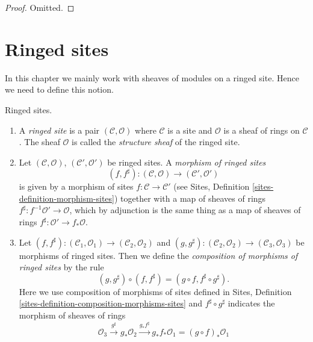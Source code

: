 \begin{proof}
Omitted.
\end{proof}








\section{Ringed sites}
\label{section-ringed-sites}

\noindent
In this chapter we mainly work with sheaves of modules on a ringed site.
Hence we need to define this notion.

\begin{definition}
\label{definition-ringed-site}
Ringed sites.
\begin{enumerate}
\item A {\it ringed site} is a pair $(\mathcal{C}, \mathcal{O})$
where $\mathcal{C}$ is a site and $\mathcal{O}$ is a sheaf of rings
on $\mathcal{C}$. The sheaf $\mathcal{O}$ is called the
{\it structure sheaf} of the ringed site.
\item Let $(\mathcal{C}, \mathcal{O})$, $(\mathcal{C}', \mathcal{O}')$ be ringed
sites. A {\it morphism of ringed sites}
$$
(f, f^\sharp) :
(\mathcal{C}, \mathcal{O})
\longrightarrow
(\mathcal{C}', \mathcal{O}')
$$
is given by a morphism of sites $f : \mathcal{C} \to \mathcal{C}'$
(see Sites, Definition \ref{sites-definition-morphism-sites})
together with a map of sheaves of rings
$f^\sharp : f^{-1}\mathcal{O}' \to \mathcal{O}$, which by adjunction
is the same thing as a map of sheaves of rings
$f^\sharp : \mathcal{O}' \to f_*\mathcal{O}$.
\item Let
$(f, f^\sharp) :
(\mathcal{C}_1, \mathcal{O}_1) \to (\mathcal{C}_2, \mathcal{O}_2)$ and
$(g, g^\sharp) :
(\mathcal{C}_2, \mathcal{O}_2) \to (\mathcal{C}_3, \mathcal{O}_3)$
be morphisms of ringed sites. Then we define
the {\it composition of morphisms of ringed sites}
by the rule
$$
(g, g^\sharp) \circ (f, f^\sharp) = (g \circ f, f^\sharp \circ g^\sharp).
$$
Here we use composition of morphisms of sites defined in
Sites, Definition \ref{sites-definition-composition-morphisms-sites}
and $f^\sharp \circ g^\sharp$ indicates the morphism of sheaves of
rings
$$
\mathcal{O}_3 \xrightarrow{g^\sharp} g_*\mathcal{O}_2
\xrightarrow{g_*f^\sharp} g_*f_*\mathcal{O}_1 = (g \circ f)_*\mathcal{O}_1
$$
\end{enumerate}
\end{definition}






